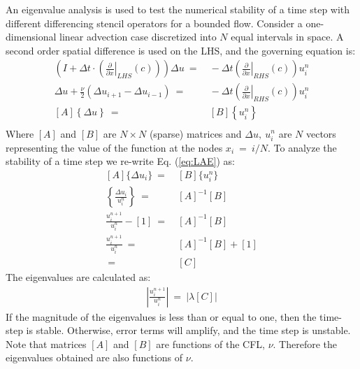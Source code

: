 \documentclass[conf]{new-aiaa}
\begin{document}
An eigenvalue analysis is used to test the numerical stability of a time step with different differencing stencil operators for a bounded flow. 
Consider a one-dimensional linear advection case discretized into $N$ equal intervals in space. 
A second order spatial difference is used on the LHS, and the governing equation is:
\begin{equation}
	\begin{split}
		\label{eq:LAE}
  			\left(I+\Delta{t}\cdot\left(\left.\frac{\partial}{\partial{x}}\right|_{LHS}\left(c\right)\right)\right)\Delta{u}~=&~-\Delta{t}\left(\left.\frac{\partial}{\partial{x}}\right|_{RHS}\left(c\right)\right) {u}_i^{n} \\
  			\Delta{u}+\frac{\nu}{2}\left(\Delta{u_{i+1}}-\Delta{u_{i-1}} \right)~=&~-\Delta{t}\left(\left.\frac{\partial}{\partial{x}}\right|_{RHS}\left(c\right)\right) {u}_i^{n} \\
  			\left[A\right]\left\{\Delta{u}\right\}~=&~\left[B\right]\left\{u_{i}^{n}\right\} \\
	\end{split}
\end{equation}
Where $[A]$ and $[B]$ are $N\times{N}$ (sparse) matrices and $\Delta{u},~u_{i}^{n}$ are $N$ vectors representing the value of the function at the nodes $x_i~=~i/N$.
To analyze the stability of a time step we re-write Eq. (\ref{eq:LAE}) as:
\begin{equation}
\label{eq:AB}
	\begin{split}
  		[A]\{\Delta{u_i\}}~=&~[B]\{u_i^{n}\} \\
  		\left\{\frac{\Delta{u_i}}{u_i^{n}}\right\}~=&~[A]^{-1}[B] \\
  		\frac{u_i^{n+1}}{u_i^{n}} - [1]~=&~[A]^{-1}[B] \\
  		\frac{u_i^{n+1}}{u_i^{n}}~=&~[A]^{-1}[B] + [1] \\
  		~=&~[C]
	\end{split}
\end{equation}
The eigenvalues are calculated as:
\begin{equation}
	\begin{split}
		\label{eq:Magnitude_Of_Eigen}
  			\left|\frac{u_i^{n+1}}{u_i^{n}}\right|~=~\left|\lambda\left[C\right]\right|
	\end{split}
\end{equation}
If the magnitude of the eigenvalues is less than or equal to one, then the time-step is stable.  
Otherwise, error terms will amplify, and the time step is unstable.
Note that matrices $[A]$ and $[B]$ are functions of the CFL, $\nu$. 
Therefore the eigenvalues obtained are also functions of $\nu$. 
\end{document}
